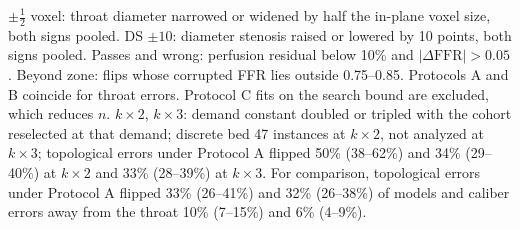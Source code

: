 \documentclass[journal,twoside,web,onecolumn]{ieeecolor}
\begin{document}
\begin{table}[!ht]
\parbox{0.95\textwidth}{\footnotesize $\pm\tfrac12$ voxel: throat diameter narrowed or widened by half the in-plane voxel size, both signs pooled. DS $\pm10$: diameter stenosis raised or lowered by 10 points, both signs pooled. Passes and wrong: perfusion residual below 10\% and $|\Delta\mathrm{FFR}| > 0.05$. Beyond zone: flips whose corrupted FFR lies outside 0.75--0.85. Protocols A and B coincide for throat errors. Protocol C fits on the search bound are excluded, which reduces $n$. $k\times2$, $k\times3$: demand constant doubled or tripled with the cohort reselected at that demand; discrete bed 47 instances at $k\times2$, not analyzed at $k\times3$; topological errors under Protocol A flipped 50\% (38--62\%) and 34\% (29--40\%) at $k\times2$ and 33\% (28--39\%) at $k\times3$. For comparison, topological errors under Protocol A flipped 33\% (26--41\%) and 32\% (26--38\%) of models and caliber errors away from the throat 10\% (7--15\%) and 6\% (4--9\%).}
\end{table}

\FloatBarrier
{}
\end{document}
